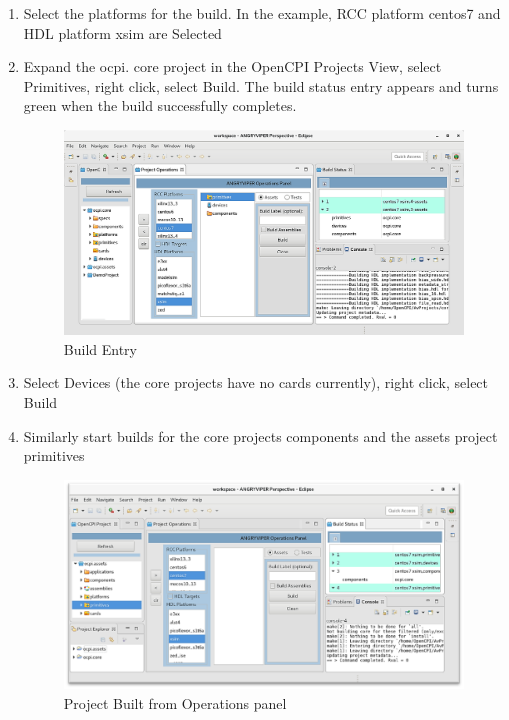 \documentclass[10pt, a4paper, oneside]{article}
\begin{document}
\begin{enumerate}
\item	Select the platforms for the build. In the example, RCC platform centos7 and HDL platform xsim are Selected
\item	Expand the ocpi. core project in the OpenCPI Projects View, select Primitives, right click, select Build. The build status entry appears and turns green when the build successfully completes.
\begin{figure}[h!]
	\centering
	\caption{Build Entry}\label{fig:Build Entry}
	\includegraphics[width=.90\textwidth]{BuildEntry.png}
 \end{figure}

\item Select Devices (the core projects have no cards currently), right click, select Build
\item Similarly start builds for the core projects components and the assets project primitives
\begin{figure}[h!]
	\centering
	\caption{Project Built from Operations panel}\label{fig:Project Built from Ops panel}
	\includegraphics[width=.90\textwidth]{ProjectBuiltfromOpsPanel.png}
 \end{figure}


\end{enumerate}
\end{document}
